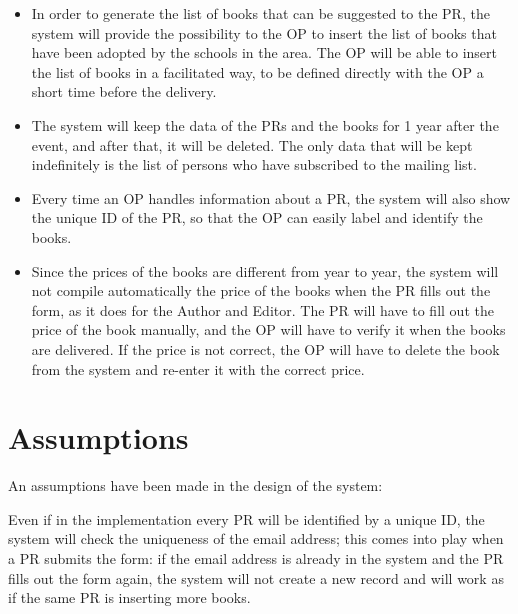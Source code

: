 \begin{itemize}
    \item In order to generate the list of books that can be suggested to the PR, the system will provide the possibility to the OP to insert the list of books that have been adopted by the schools in the area. The OP will be able to insert the list of books in a facilitated way, to be defined directly with the OP a short time before the delivery.
    \item The system will keep the data of the PRs and the books for 1 year after the event, and after that, it will be deleted. The only data that will be kept indefinitely is the list of persons who have subscribed to the mailing list.
    \item Every time an OP handles information about a PR, the system will also show the unique ID of the PR, so that the OP can easily label and identify the books.
    \item Since the prices of the books are different from year to year, the system will not compile automatically the price of the books when the PR fills out the form, as it does for the Author and Editor. The PR will have to fill out the price of the book manually, and the OP will have to verify it when the books are delivered. If the price is not correct, the OP will have to delete the book from the system and re-enter it with the correct price.
\end{itemize}

\section{Assumptions}
\label{sec:assumptions}

An assumptions have been made in the design of the system:

Even if in the implementation every PR will be identified by a unique ID, the system will check the uniqueness of the email address; this comes into play when a PR submits the form: if the email address is already in the system and the PR fills out the form again, the system will not create a new record and will work as if the same PR is inserting more books.